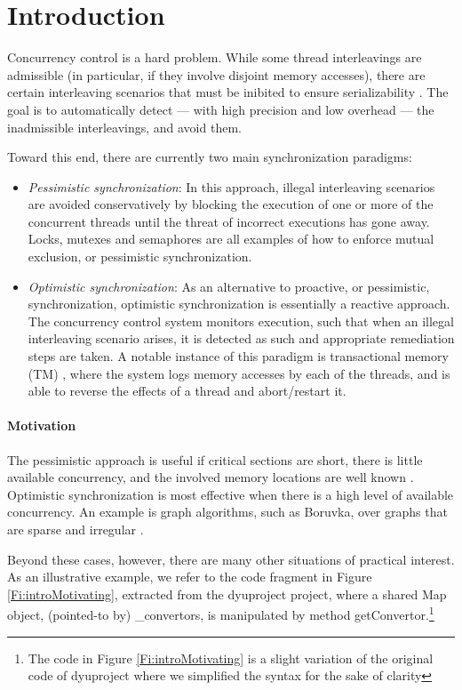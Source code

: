 \section{Introduction}

Concurrency control is a hard problem. While some thread interleavings are admissible (in particular, if they involve disjoint memory accesses), there are certain interleaving scenarios that must be inibited to ensure serializability \cite{Serializability}. The goal is to automatically detect --- with high precision and low overhead --- the inadmissible interleavings, and avoid them.  

Toward this end, there are currently two main synchronization paradigms:
\begin{itemize}
	\item \textit{Pessimistic synchronization}: In this approach, illegal interleaving scenarios are avoided conservatively by blocking the execution of one or more of the concurrent threads until the threat of incorrect executions has gone away. Locks, mutexes and semaphores are all examples of how to enforce mutual exclusion, or pessimistic synchronization.
	\item \textit{Optimistic synchronization}: As an alternative to proactive, or pessimistic, synchronization, optimistic synchronization is essentially a reactive approach. The concurrency control system monitors execution, such that when an illegal interleaving scenario arises, it is detected as such and appropriate remediation steps are taken. A notable instance of this paradigm is transactional memory (TM) \cite{DBLP:conf/isca/HerlihyM93}, where the system logs memory accesses by each of the threads, and is able to reverse the effects of a thread and abort/restart it.
\end{itemize}

\paragraph{Motivation} The pessimistic approach is useful if critical sections are short, there is little available concurrency, and the involved memory locations are well known \cite{AndiKleen}. Optimistic synchronization is most effective when there is a high level of available concurrency. An example is graph algorithms, such as Boruvka, over graphs that are sparse and irregular \cite{KulkarniGalois}.

Beyond these cases, however, there are many other situations of practical interest. As an illustrative example, we refer to the code fragment in Figure \ref{Fi:introMotivating}, extracted from the {\sf dyuproject} project, where a shared {\sf Map} object, (pointed-to by) {\sf \_convertors}, is manipulated by method {\sf getConvertor}.\footnote{The code in Figure \ref{Fi:introMotivating} is a slight variation of the original code of {\sf dyuproject} where we simplified the syntax for the sake of clarity}

